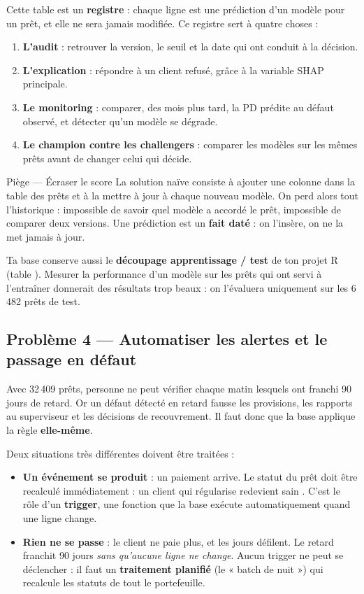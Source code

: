 Cette table est un \textbf{registre} : chaque ligne est une prédiction d'un modèle pour un prêt, et elle
ne sera jamais modifiée. Ce registre sert à quatre choses :
\begin{enumerate}
\item \textbf{L'audit} : retrouver la version, le seuil et la date qui ont conduit à la décision.
\item \textbf{L'explication} : répondre à un client refusé, grâce à la variable SHAP principale.
\item \textbf{Le monitoring} : comparer, des mois plus tard, la PD prédite au défaut observé, et
détecter qu'un modèle se dégrade.
\item \textbf{Le champion contre les challengers} : comparer les modèles sur les mêmes prêts avant de
changer celui qui décide.
\end{enumerate}

\begin{piege}{Piège --- Écraser le score}
La solution naïve consiste à ajouter une colonne  dans la table des prêts et à la mettre à
jour à chaque nouveau modèle. On perd alors tout l'historique : impossible de savoir quel modèle a
accordé le prêt, impossible de comparer deux versions. Une prédiction est un \textbf{fait daté} : on
l'insère, on ne la met jamais à jour.
\end{piege}

Ta base conserve aussi le \textbf{découpage apprentissage / test} de ton projet R (table
). Mesurer la performance d'un modèle sur les prêts qui ont servi à
l'entraîner donnerait des résultats trop beaux : on l'évaluera uniquement sur les 6\,482 prêts de test.

\subsection{Problème 4 --- Automatiser les alertes et le passage en défaut}

Avec 32\,409 prêts, personne ne peut vérifier chaque matin lesquels ont franchi 90 jours de retard.
Or un défaut détecté en retard fausse les provisions, les rapports au superviseur et les décisions de
recouvrement. Il faut donc que la base applique la règle \textbf{elle-même}.

Deux situations très différentes doivent être traitées :

\begin{itemize}
\item \textbf{Un événement se produit} : un paiement arrive. Le statut du prêt doit être recalculé
immédiatement : un client qui régularise redevient \og sain \fg{}. C'est le rôle d'un
\textbf{trigger}, une fonction que la base exécute automatiquement quand une ligne change.
\item \textbf{Rien ne se passe} : le client ne paie plus, et les jours défilent. Le retard franchit 90
jours \emph{sans qu'aucune ligne ne change}. Aucun trigger ne peut se déclencher : il faut un
\textbf{traitement planifié} (le « batch de nuit ») qui recalcule les statuts de tout le portefeuille.
\end{itemize}

